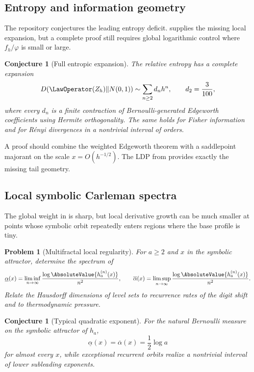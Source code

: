 \documentclass[11pt]{article}
\numberwithin{equation}{section}
\newtheorem{conjecture}[theorem]{Conjecture}
\newtheorem{problem}[theorem]{Problem}
\theoremstyle{definition}
\newcommand{\phiN}{\varphi}
\begin{document}
\subsection{Entropy and information geometry}
The repository conjectures the leading entropy deficit.   supplies the missing local expansion, but a complete proof still requires global logarithmic control where \(f_h/\phiN\) is small or large.

\begin{conjecture}[Full entropic expansion]\label{conj:entropy}
The relative entropy has a complete expansion
\begin{equation}\label{eq:entropy-series}
 D(\LawOperator(Z_h)\Vert N(0,1))
 \sim \sum_{n\ge2}d_nh^n,
 \qquad d_2=\frac3{100},
\end{equation}
where every \(d_n\) is a finite contraction of Bernoulli-generated Edgeworth coefficients using Hermite orthogonality.  The same holds for Fisher information and for Rényi divergences in a nontrivial interval of orders.
\end{conjecture}

A proof should combine the weighted Edgeworth theorem with a saddlepoint majorant on the scale \(x=O(h^{-1/2})\).  The LDP from  provides exactly the missing tail geometry.

\subsection{Local symbolic Carleman spectra}
The global weight in  is sharp, but local derivative growth can be much smaller at points whose symbolic orbit repeatedly enters regions where the base profile is tiny.

\begin{problem}[Multifractal local regularity]\label{prob:local-carleman}
For \(a\ge2\) and \(x\) in the symbolic attractor, determine the spectrum of
\begin{equation}\label{eq:local-growth-spectrum}
 \underline\alpha(x)=\liminf_{n\to\infty}\frac{\log\AbsoluteValue{h_a^{(n)}(x)}}{n^2},
 \qquad
 \overline\alpha(x)=\limsup_{n\to\infty}\frac{\log\AbsoluteValue{h_a^{(n)}(x)}}{n^2}.
\end{equation}
Relate the Hausdorff dimensions of level sets to recurrence rates of the digit shift and to thermodynamic pressure.
\end{problem}

\begin{conjecture}[Typical quadratic exponent]\label{conj:typical-carleman}
For the natural Bernoulli measure on the symbolic attractor of \(h_a\),
\[
 \underline\alpha(x)=\overline\alpha(x)=\frac12\log a
\]
for almost every \(x\), while exceptional recurrent orbits realize a nontrivial interval of lower subleading exponents.
\end{conjecture}
\end{document}
